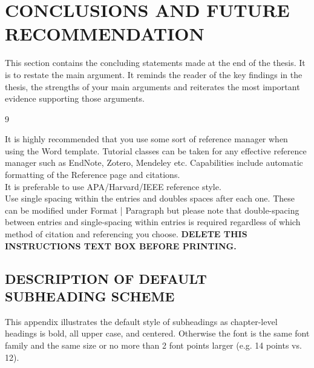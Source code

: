 \documentclass{article}
\begin{document}
\begin{justify}
\chapter{CONCLUSIONS AND FUTURE RECOMMENDATION}
\noindent This section contains the concluding statements made at the end of the thesis. It is to restate the main argument. It reminds the reader of the key findings in the thesis, the strengths of your main arguments and reiterates the most important evidence supporting those arguments.\\
   \begin{thebibliography}{9}
		\end{thebibliography}
\begin{tcolorbox}[enhanced jigsaw,
    sharp corners,
    boxrule=0.5pt, 
    colback=blue!30!white,   
    borderline={0.5pt}{-2pt}{black,solid} %
 ]
 \begin{justify}
 It is highly recommended that you use some sort of reference manager when using the Word template. Tutorial classes can be taken for any effective reference manager such as EndNote, Zotero, Mendeley etc. Capabilities include automatic formatting of the Reference page and citations.\\
It is preferable to use APA/Harvard/IEEE reference style.\\
Use single spacing within the entries and doubles spaces after each one. These can be modified under Format | Paragraph but please note that double-spacing between entries and single-spacing within entries is required regardless of which method of citation and referencing you choose.\vspace{1cm}
\bf{DELETE THIS INSTRUCTIONS TEXT BOX BEFORE PRINTING.}
\end{justify}
\end{tcolorbox}
\begin{appendix}
    \begin{center}
\chapter {DESCRIPTION OF DEFAULT SUBHEADING SCHEME}
\end{center}
This appendix illustrates the default style of subheadings as chapter-level headings is bold, all upper case, and centered. Otherwise the font is the same font family and the same size or no more than 2 font points larger (e.g. 14 points vs. 12).

\end{appendix}
\end{justify}
\end{document}
